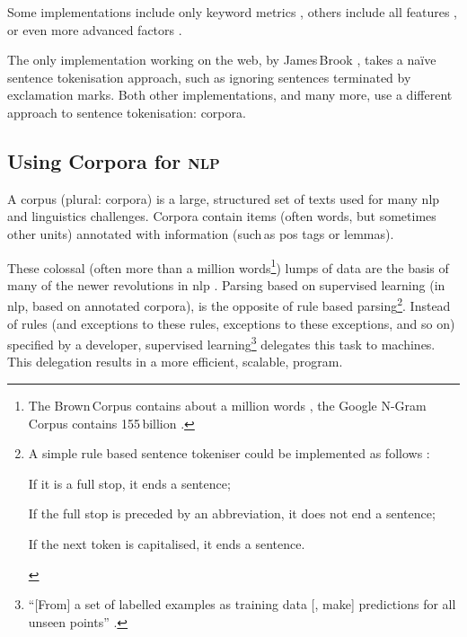 \noindent Some implementations include only keyword metrics
  \autocite{jbrooksuk/node-summary-source-code}, others include all features
  \autocite{MojoJolo/textteaser-source-code}, or even more advanced factors
  \autocite{summly}.

The only implementation working on the web, by James\,Brook
  \autocite*{jbrooksuk/node-summary-source-code}, takes a na\"ive sentence
  tokenisation approach, such as ignoring sentences terminated by
  exclamation marks.
Both other implementations, and many more, use a different approach to
  sentence tokenisation: corpora.

\subsection{Using Corpora for \textsc{nlp}}\label{using-corpora-for}

A corpus (plural: corpora) is a large, structured set of texts used for many
  \gls{nlp} and linguistics challenges.
Corpora contain items (often words, but sometimes other units) annotated
  with information (such\,as \gls{pos} tags or lemmas).

These colossal (often more than a million words\footnote{The Brown\,Corpus
    contains about a million words \autocite{francis-nelson-brown-corpus},
    the Google N-Gram\,Corpus contains 155\,billion
    \autocite{brants-thorsten-google-ngram-corpus}.})
  lumps of data are the basis of many of the newer revolutions in \gls{nlp}
  \autocite{mitkov-ruslan-ea-importance-corpora}.
Parsing based on supervised learning (in \gls{nlp}, based on annotated
  corpora), is the opposite of rule based parsing\footnote{A simple
    rule based sentence tokeniser could be implemented as follows
    \autocite{attivio.com-doing-things-with-sentences}:

    \begin{aenumerate}
      \item If it is a full stop, it ends a sentence;
      \item If the full stop is preceded by an abbreviation, it does not end
        a sentence;
      \item If the next token is capitalised, it ends a sentence.
    \end{aenumerate}}.
Instead of rules (and exceptions to these rules, exceptions to these
  exceptions, and so on) specified by a developer,
  supervised learning\footnote{``{[}From{]} a set of labelled examples as
    training data {[}, make{]} predictions for all unseen points''
    \autocite{mohri-mehryar-foundations-machine-learning}.}
  delegates this task to machines.
This delegation results in a more efficient, scalable, program.

